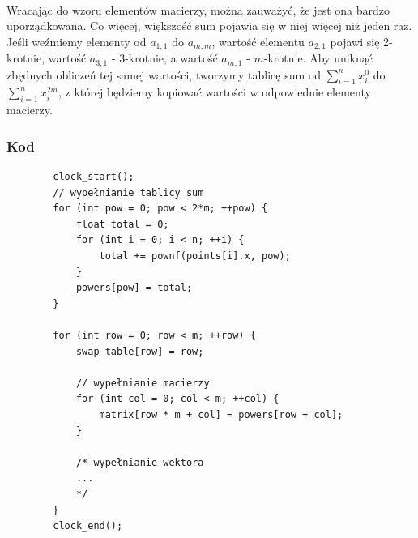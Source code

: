 \documentclass[12pt]{report}
\begin{document}
	\paragraph{}
	Wracając do wzoru elementów macierzy, można zauważyć, że jest ona bardzo uporządkowana. Co więcej, większość sum pojawia się w niej więcej niż jeden raz. Jeśli weźmiemy elementy od $a_{1,1}$ do $a_{m,m}$, wartość elementu $a_{2,1}$ pojawi się 2-krotnie, wartość $a_{3,1}$ - 3-krotnie, a wartość $a_{m,1}$ - $m$-krotnie. Aby uniknąć zbędnych obliczeń tej samej wartości, tworzymy tablicę sum od $\sum_{i=1}^{n}x_i^0$ do $\sum_{i=1}^{n}x_i^{2m}$, z której będziemy kopiować wartości w odpowiednie elementy macierzy.
	
	\subsubsection{Kod}
	\begin{verbatim}
		clock_start();
		// wypełnianie tablicy sum
		for (int pow = 0; pow < 2*m; ++pow) {
			float total = 0;
			for (int i = 0; i < n; ++i) {
				total += pownf(points[i].x, pow);
			}
			powers[pow] = total;
		}
		
		for (int row = 0; row < m; ++row) {
			swap_table[row] = row;
			
			// wypełnianie macierzy
			for (int col = 0; col < m; ++col) {
				matrix[row * m + col] = powers[row + col];
			}
			
			/* wypełnianie wektora
			...
			*/
		}
		clock_end();
	\end{verbatim}
	
	\pagebreak
\end{document}

